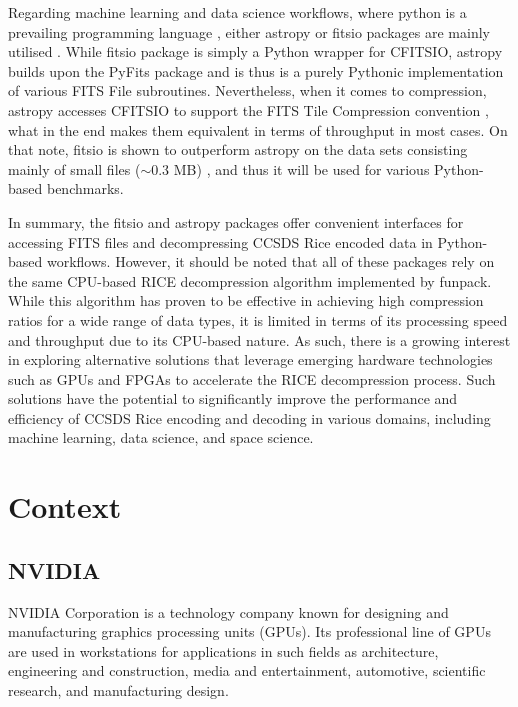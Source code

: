 \documentclass[licencjacka,en]{pracamgr}
\begin{document}
Regarding machine learning and data science workflows, where python is a prevailing programming language \cite{dev-survey}, either astropy or fitsio packages are mainly utilised \cite{astropy} \cite{fitsio} . While fitsio package is simply a Python wrapper for CFITSIO, astropy builds upon the PyFits package and is thus is a purely Pythonic implementation of various FITS File subroutines. Nevertheless, when it comes to compression, astropy accesses CFITSIO to support the FITS Tile Compression convention \cite{astropy}, what in the end makes them equivalent in terms of throughput in most cases. On that note, fitsio is shown to outperform astropy on the data sets consisting mainly of small files ($\sim0.3$ MB) \cite{astropy vs fitsio}, and thus it will be used for various Python-based benchmarks.

In summary, the fitsio and astropy packages offer convenient interfaces for accessing FITS files and decompressing CCSDS Rice encoded data in Python-based workflows. However, it should be noted that all of these packages rely on the same CPU-based RICE decompression algorithm implemented by funpack. While this algorithm has proven to be effective in achieving high compression ratios for a wide range of data types, it is limited in terms of its processing speed and throughput due to its CPU-based nature. As such, there is a growing interest in exploring alternative solutions that leverage emerging hardware technologies such as GPUs and FPGAs to accelerate the RICE decompression process. Such solutions have the potential to significantly improve the performance and efficiency of CCSDS Rice encoding and decoding in various domains, including machine learning, data science, and space science.

\chapter{Context}\label{r:losers}

\section{NVIDIA}
NVIDIA Corporation is a technology company known for designing and manufacturing graphics processing units (GPUs). Its professional line of GPUs are used in workstations for applications in such fields as architecture, engineering and construction, media and entertainment, automotive, scientific research, and manufacturing design. 
\end{document}
